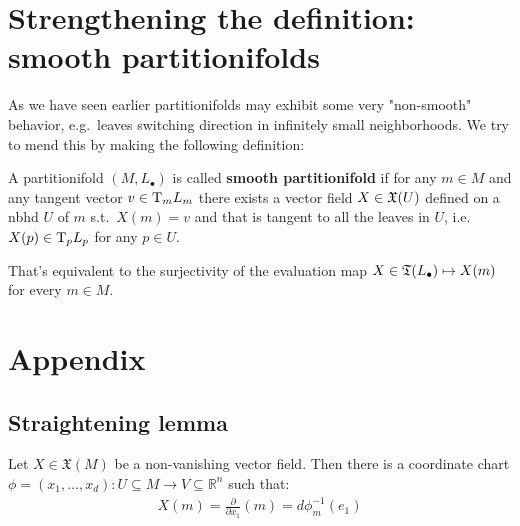 \section{Strengthening the definition: smooth partitionifolds}

	As we have seen earlier partitionifolds may exhibit some very "non-smooth" behavior, e.g.\ leaves switching direction in infinitely small neighborhoods. We try to mend this by making the following definition:

	\begin{definition}
		A partitionifold $(M, L_\bullet)$ is called \textbf{smooth partitionifold} if for any $m \in M$ and any tangent vector $v \in \mathrm{T}_m L_m$ there exists a vector field $X \in \mathfrak{X}(U)$ defined on a nbhd $U$ of $m$ s.t.\ $X(m) = v$ and that is tangent to all the leaves in $U$, i.e.\ $X(p) \in \mathrm{T}_p L_p$ for any $p \in U$.
	\end{definition}

	\begin{remark}
		That's equivalent to the surjectivity of the evaluation map $X \in \mathfrak{T}(L_\bullet) \mapsto X(m)$ for every $m \in M$.
	\end{remark}

\newpage

\section{Appendix}
        \subsection{Straightening lemma}
        \begin{prop}
            Let $X \in \mathfrak{X}(M)$ be a non-vanishing vector field. Then there is a coordinate chart $\phi = (x_1, \ldots, x_d) : U \subseteq M \to V \subseteq \mathbb{R}^n$ such that:
            \begin{align*}
                X(m) = \frac{\partial}{\partial x_1}(m) = d \phi_m^{-1}(e_1)
            \end{align*}
        \end{prop}
    

